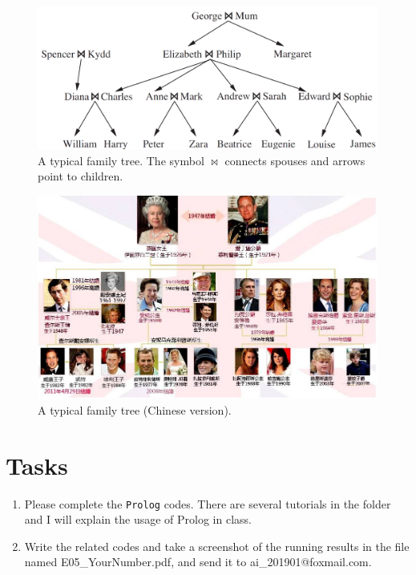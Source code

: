 ﻿\documentclass[a4paper, 11pt]{article}
\begin{document}
\begin{figure}[h]
  \centering
  \includegraphics[width=15cm]{fig/family}

  \label{fig:family}
  \caption{A typical family tree. The symbol $\bowtie$ connects spouses and arrows point to children.}
\end{figure}
\begin{figure}[h]
  \centering
  \includegraphics[width=15cm]{fig/Family_chinese.png}

  \label{fig:family_chinese}
  \caption{A typical family tree (Chinese version).}
\end{figure}

\section{Tasks}
\begin{enumerate}
\item Please complete the \texttt{Prolog} codes. There are several tutorials in the folder and I will explain the usage of Prolog in class.
\item Write the related codes and take a screenshot of the running results in the file named \textsf{E05\_YourNumber.pdf}, and send it to \textsf{ai\_201901@foxmail.com}.
\end{enumerate}
\end{document}
